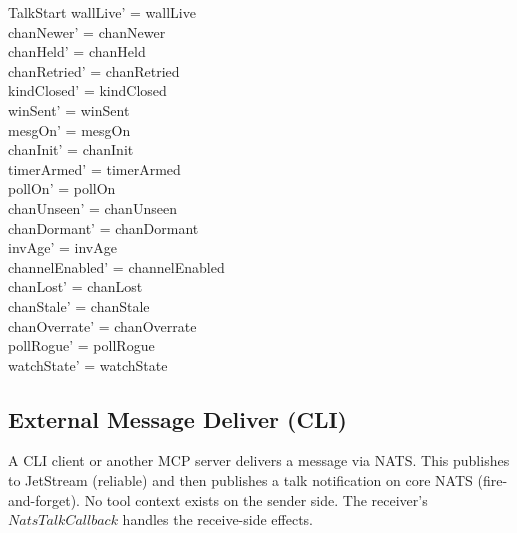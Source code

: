 \documentclass[a4paper,10pt,fleqn]{article}
\begin{document}
\begin{schema}{TalkStart}
  wallLive' = wallLive \\
  chanNewer' = chanNewer \\
  chanHeld' = chanHeld \\
  chanRetried' = chanRetried \\
  kindClosed' = kindClosed \\
  winSent' = winSent \\
  mesgOn' = mesgOn \\
  chanInit' = chanInit \\
  timerArmed' = timerArmed \\
  pollOn' = pollOn \\
  chanUnseen' = chanUnseen \\
  chanDormant' = chanDormant \\
  invAge' = invAge \\
  channelEnabled' = channelEnabled \\
  chanLost' = chanLost \\
  chanStale' = chanStale \\
  chanOverrate' = chanOverrate \\
  pollRogue' = pollRogue \\
  watchState' = watchState
\end{schema}

\subsection{External Message Deliver (CLI)}

A CLI client or another MCP server delivers a message via NATS.
This publishes to JetStream (reliable) and then publishes a
talk notification on core NATS (fire-and-forget).  No tool
context exists on the sender side.  The receiver's $NatsTalkCallback$
handles the receive-side effects.
\end{document}
